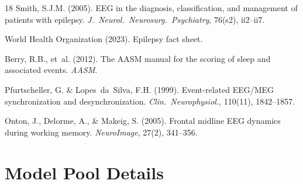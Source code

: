 \documentclass{article}
\begin{document}
\begin{thebibliography}{18}
Smith, S.J.M. (2005). EEG in the diagnosis, classification, and management of patients with epilepsy. \textit{J.\ Neurol.\ Neurosurg.\ Psychiatry}, 76(s2), ii2--ii7.

{World Health Organization} (2023). Epilepsy fact sheet.

Berry, R.B., et~al. (2012). The AASM manual for the scoring of sleep and associated events. \textit{AASM}.

Pfurtscheller, G. \& Lopes~da~Silva, F.H. (1999). Event-related EEG/MEG synchronization and desynchronization. \textit{Clin.\ Neurophysiol.}, 110(11), 1842--1857.

Onton, J., Delorme, A., \& Makeig, S. (2005). Frontal midline EEG dynamics during working memory. \textit{NeuroImage}, 27(2), 341--356.

\end{thebibliography}


\appendix

\section{Model Pool Details}
\label{app:models}
\end{document}
